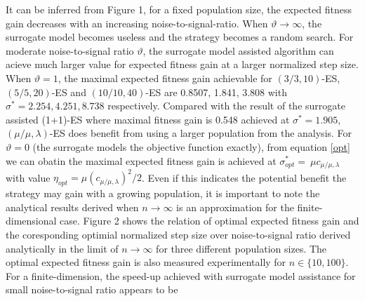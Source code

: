 It can be inferred from Figure 1, for a fixed population size, the expected fitness gain decreases with an increasing noise-to-signal-ratio. When $\vartheta \rightarrow \infty$, the surrogate model becomes useless and the strategy becomes a random search. For moderate noise-to-signal ratio $\vartheta$, the surrogate model assisted algorithm can acieve much larger value for expected fitness gain at a larger normalized step size. When $\vartheta = 1$, the maximal expected fitness gain achievable for $(3/3,10)$-ES,$(5/5,20)$-ES and $(10/10,40)$-ES are 0.8507, 1.841, 3.808 with $\sigma^*=2.254,4.251,8.738$ respectively. Compared with the result of the surrogate assisted (1+1)-ES \cite{DBLP:conf/ppsn/KayhaniA18} where maximal fitness gain is 0.548 achieved at $\sigma^* = 1.905$, $(\mu/\mu,\lambda)$-ES does benefit from using a larger population from the analysis. For $\vartheta=0$ (the surrogate models the objective function exactly), from equation \ref{opt} we can obatin the maximal expected fitness gain is achieved at $\sigma^*_{opt} = \ \mu c_{\mu / \mu, \lambda}$ with value $\eta_{opt} =  \mu (c_{\mu / \mu, \lambda})^2/2$. Even if this indicates the potential benefit the strategy may gain with a growing population, it is important to note the analytical results derived when $n \rightarrow \infty$ is an approximation for the finite-dimensional case. Figure 2 shows the relation of optimal expected fitness gain and the coresponding optimial normalized step size over noise-to-signal ratio derived analytically in the limit of $n \rightarrow \infty$ for three different population sizes. The optimal expected fitness gain is also measured experimentally for $n \in \{10,100 \}$. For a finite-dimension, the speed-up achieved with surrogate model assistance for small noise-to-signal ratio appears to be 





